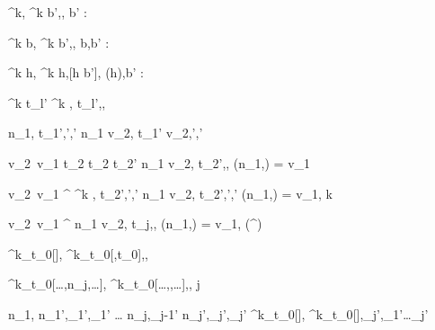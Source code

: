   {}
  {\Enter^k\beta,\sigma {} \Update^k b',\sigma,\nothing}
  {b' : \beta}


  {}
  {\Update^k b,\sigma {} \Update^k b',\sigma,\nothing}
  {b,b' : \beta}

  {}
  {\Change^k h,\sigma {} \Change^k h,[h \mapsto b']\sigma,}
  {\sigma(h),b' : \beta}



	{\Select^k   t_{l'}}
	{\Select^k ,\sigma {} t_{l'},\sigma,\nothing}
  {}



  {n_1,\sigma \handle{\iota} t_1',\sigma',\delta'}
  {n_1 \Step v_2,\sigma \handle{\iota} t_1' \Step v_2,\sigma',\delta'}
  {}

	{v_2\ v_1 \evaluate t_2 \Quad
   t_2  t_2'}
  {n_1 \Step v_2,\sigma {} t_2',\sigma,\nothing}
  {\Value(n_1,\sigma) = v_1}

	{v_2\ v_1 \evaluate \Select^\epsilon {} \Quad
   \Select^k ,\sigma {} t_2',\sigma',\delta'}
  {n_1 \Step v_2,\sigma {} t_2',\sigma',\delta'}
  {\Value(n_1,\sigma) = v_1, k }

	{v_2\ v_1 \evaluate \Select^\epsilon {}}
  {n_1 \Step v_2,\sigma {} t_j,\sigma,\nothing}
  {\Value(n_1,\sigma) = v_1, \in \Options(\Select^\epsilon {})}



  {}
  {\Pool^k_{t_0}[],\sigma {} \Pool^k_{t_0}[,t_0],\sigma,\nothing}
  {}

  {}
  {\Pool^k_{t_0}[\ldots,n_j,\ldots],\sigma {} \Pool^k_{t_0}[\ldots,,\ldots],\sigma,\nothing}
  {\each j}

	{n_1,\sigma {} n_1',\sigma_1',\delta_1' \Quad
   \ldots \Quad
   n_j,\sigma_{j-1}'  n_j',\sigma_j',\delta_j'
  }
	{\Pool^k_{t_0}[],\sigma {} \Pool^k_{t_0}[],\sigma_j',\delta_1'\cup\ldots\cup\delta_j'}
  {}




